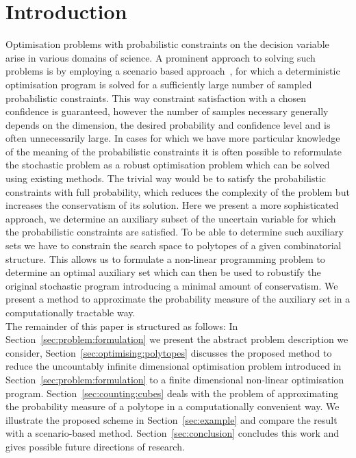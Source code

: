 \documentclass[letterpaper, 10pt, conference]{ieeeconf} %
\begin{document}
\section{Introduction}\label{sec:intro}%
%
%
%
%
%
\noindent Optimisation problems with probabilistic constraints on the decision variable arise in various domains of science.
%
A prominent approach to solving such problems is by employing a scenario based approach~\cite{Calafiore:2010}, for which a deterministic optimisation program is solved for a sufficiently large number of sampled probabilistic constraints.
%
This way constraint satisfaction with a chosen confidence is guaranteed, however the number of samples necessary generally depends on the dimension, the desired probability and confidence level and is often unnecessarily large.
%
In cases for which we have more particular knowledge of the meaning of the probabilistic constraints it is often possible to reformulate the stochastic problem as a robust optimisation problem which can be solved using existing methods.
%
The trivial way would be to satisfy the probabilistic constraints with full probability, which reduces the complexity of the problem but increases the conservatism of its solution.
%
Here we present a more sophisticated approach, we determine an auxiliary subset of the uncertain variable for which the probabilistic constraints are satisfied.
%
To be able to determine such auxiliary sets we have to constrain the search space to polytopes of a given combinatorial structure.
%
This allows us to formulate a non-linear programming problem to determine an optimal auxiliary set which can then be used to robustify the original stochastic program introducing a minimal amount of conservatism.
%
We present a method to approximate the probability measure of the auxiliary set in a computationally tractable way.
%
\\[1em]
%
The remainder of this paper is structured as follows:
%
In Section~\ref{sec:problem:formulation} we present the abstract problem description we consider, Section~\ref{sec:optimising:polytopes} discusses the proposed method to reduce the uncountably infinite dimensional optimisation problem introduced in Section~\ref{sec:problem:formulation} to a finite dimensional non-linear optimisation program.
%
Section~\ref{sec:counting:cubes} deals with the problem of approximating the probability measure of a polytope in a computationally convenient way.
%
We illustrate the proposed scheme in Section~\ref{sec:example} and compare the result with a scenario-based method.
%
Section~\ref{sec:conclusion} concludes this work and gives possible future directions of research.
\end{document}
